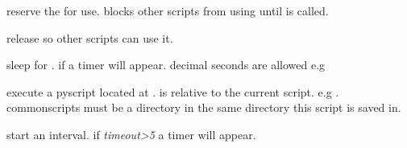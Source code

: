 \documentclass[letterpaper,10pt,english]{sphinxmanual}
\begin{document}
\begin{fulllineitems}
\label{general_scripting:acquire}
reserve the  for use. blocks other scripts from using  until
{\hyperref[general_scripting:release]{}} is called.

\end{fulllineitems}


\begin{fulllineitems}
\label{general_scripting:release}
release  so other scripts can use it.

\end{fulllineitems}


\begin{fulllineitems}
\label{general_scripting:sleep}
sleep for . if  a timer will appear. decimal seconds are allowed e.g 

\end{fulllineitems}


\begin{fulllineitems}
\label{general_scripting:gosub}
execute a pyscript located at .  is relative to the current
script. e.g . commonscripts must be a directory in the same
directory this script is saved in.

\end{fulllineitems}


\begin{fulllineitems}
\label{general_scripting:begin_interval}
start an interval. if \emph{timeout\textgreater{}5} a timer will appear.

\end{fulllineitems}

\end{document}

